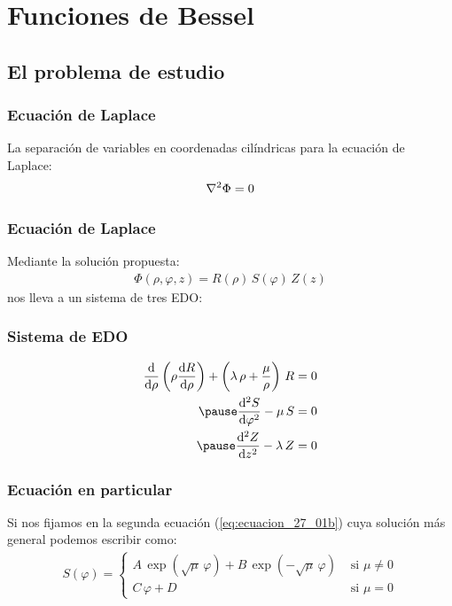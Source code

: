 \documentclass[12pt]{beamer}
\begin{document}
\section{Funciones de Bessel}
\subsection{El problema de estudio}

\begin{frame}
\frametitle{Ecuación de Laplace}
La separación de variables en coordenadas cilíndricas para la ecuación de Laplace:
\pause
\begin{align*}
\laplacian{\Phi} = 0
\end{align*}
\end{frame}
\begin{frame}
\frametitle{Ecuación de Laplace}    
Mediante la solución propuesta:
\begin{align*}
\Phi (\rho, \varphi, z) = R (\rho) \, S (\varphi) \, Z (z)
\end{align*}
nos lleva a un sistema de tres EDO:
\end{frame}
\begin{frame}
\frametitle{Sistema de EDO}
\begin{eqnarray}
\begin{aligned}
\dv{\rho} \left( \rho \dv{R}{\rho} \right) + \left( \lambda \, \rho + \dfrac{\mu}{\rho} \right) \, R &= 0 \label{eq:ecuacion_27_01a} \\ \pause
\dv[2]{S}{\varphi} - \mu \, S &= 0 \label{eq:ecuacion_27_01b}\\ \pause
\dv[2]{Z}{z} - \lambda \, Z &= 0 \label{eq:ecuacion_27_01c}
\end{aligned}
\end{eqnarray}
\end{frame}
\begin{frame}
\frametitle{Ecuación en particular}
Si nos fijamos en la segunda ecuación (\ref{eq:ecuacion_27_01b}) cuya solución más general podemos escribir como:
\pause
\begin{align}
S (\varphi) = \begin{cases}
A \, \exp(\sqrt{\mu} \, \varphi) + B \, \exp(-\sqrt{\mu} \, \varphi) & \mbox{ si } \mu \neq 0 \\
C \,\varphi + D & \mbox { si } \mu = 0
\end{cases}
\label{eq:ecuacion_27_02}
\end{align}
\end{frame}
\end{document}
